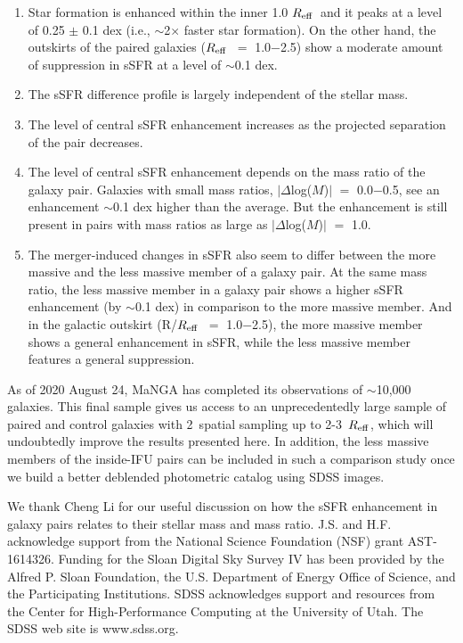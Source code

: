 \documentclass[iop,revtex4,twocolumn,apj,numberedappendix,appendixfloats]{emulateapj}
\newcommand{\reff}{$R_{\rm eff}$}
\begin{document}
\begin{enumerate}

\item Star formation is enhanced within the inner 1.0 \reff\ and it peaks at a level of 0.25 $\pm$ 0.1 dex (i.e., $\sim$2$\times$ faster star formation). On the other hand, the outskirts of the paired galaxies (\reff\ $=$ 1.0$-$2.5) show a moderate amount of suppression in sSFR at a level of $\sim$0.1 dex.
 
\item The sSFR difference profile is largely independent of the stellar mass.

\item The level of central sSFR enhancement increases as the projected separation of the pair decreases. 

\item The level of central sSFR enhancement depends on the mass ratio of the galaxy pair. Galaxies with small mass ratios, $|\Delta$log($M$)$|$ $=$ 0.0$-$0.5, see an enhancement $\sim$0.1 dex higher than the average. But the enhancement is still present in pairs with mass ratios as large as $|\Delta$log($M$)$|$ $=$ 1.0. 

\item The merger-induced changes in sSFR also seem to differ between the more massive and the less massive member of a galaxy pair. At the same mass ratio, the less massive member in a galaxy pair shows a higher sSFR enhancement (by $\sim$0.1 dex) in comparison to the more massive member. And in the galactic outskirt (R/\reff\ $=$ 1.0$-$2.5), the more massive member shows a general enhancement in sSFR, while the less massive member features a general suppression.

\end{enumerate}

As of 2020 August 24, MaNGA has completed its observations of $\sim$10,000 galaxies. This final sample gives us access to an unprecedentedly large sample of paired and control galaxies with 2\arcsec\ spatial sampling up to 2-3~\reff, which will undoubtedly improve the results presented here. In addition, the less massive members of the inside-IFU pairs can be included in such a comparison study once we build a better deblended photometric catalog using SDSS images.

\acknowledgments

We thank Cheng Li for our useful discussion on how the sSFR enhancement in galaxy pairs relates to their stellar mass and mass ratio. J.S. and H.F. acknowledge support from the National Science Foundation (NSF) grant AST-1614326. Funding for the Sloan Digital Sky Survey IV has been provided by the Alfred P. Sloan Foundation, the U.S. Department of Energy Office of Science, and the Participating Institutions. SDSS acknowledges support and resources from the Center for High-Performance Computing at the University of Utah. The SDSS web site is www.sdss.org.
\end{document}

